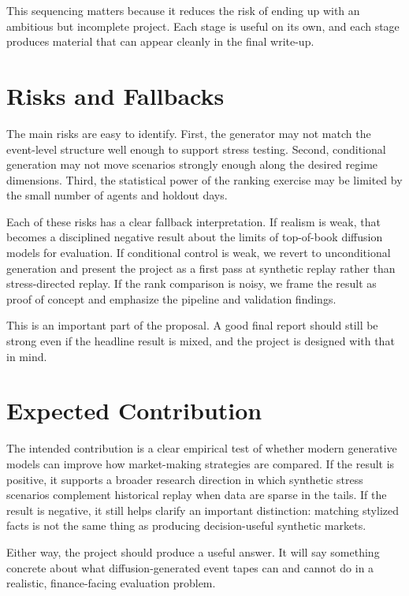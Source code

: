 \documentclass[10pt,letterpaper,twocolumn]{article}
\begin{document}
This sequencing matters because it reduces the risk of ending up with an ambitious but incomplete project. Each stage is useful on its own, and each stage produces material that can appear cleanly in the final write-up.

\section{Risks and Fallbacks}

The main risks are easy to identify. First, the generator may not match the event-level structure well enough to support stress testing. Second, conditional generation may not move scenarios strongly enough along the desired regime dimensions. Third, the statistical power of the ranking exercise may be limited by the small number of agents and holdout days.

Each of these risks has a clear fallback interpretation. If realism is weak, that becomes a disciplined negative result about the limits of top-of-book diffusion models for evaluation. If conditional control is weak, we revert to unconditional generation and present the project as a first pass at synthetic replay rather than stress-directed replay. If the rank comparison is noisy, we frame the result as proof of concept and emphasize the pipeline and validation findings.

This is an important part of the proposal. A good final report should still be strong even if the headline result is mixed, and the project is designed with that in mind.

\section{Expected Contribution}

The intended contribution is a clear empirical test of whether modern generative models can improve how market-making strategies are compared. If the result is positive, it supports a broader research direction in which synthetic stress scenarios complement historical replay when data are sparse in the tails. If the result is negative, it still helps clarify an important distinction: matching stylized facts is not the same thing as producing decision-useful synthetic markets.

Either way, the project should produce a useful answer. It will say something concrete about what diffusion-generated event tapes can and cannot do in a realistic, finance-facing evaluation problem.
\end{document}
